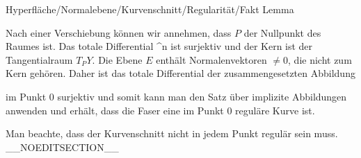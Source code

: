 {Hyperfläche/Normalebene/Kurvenschnitt/Regularität/Fakt}
{Lemma}
{}
{

\faktzusatz {}
\faktzusatz {}

}
{

Nach einer Verschiebung können wir annehmen, dass $P$ der Nullpunkt des Raumes ist. Das totale Differential
 {\R^n } {\R
} {}
ist surjektiv und der Kern ist der Tangentialraum $T_PY$. Die Ebene $E$ enthält Normalenvektoren $\neq 0$, die nicht zum Kern gehören. Daher ist das totale Differential der zusammengesetzten Abbildung

 {  }

im Punkt $0$ surjektiv und somit kann man den Satz über implizite Abbildungen anwenden und erhält, dass die Faser eine im Punkt $0$ reguläre Kurve ist.

}

Man beachte, dass der Kurvenschnitt nicht in jedem Punkt regulär sein muss.
__NOEDITSECTION__

